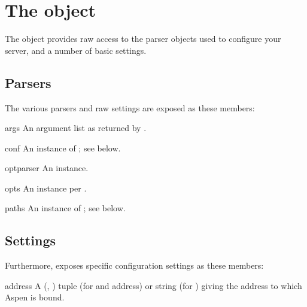 \section{The  object}
\label{api-configuration}

The  object provides raw access to the parser objects
used to configure your server, and a number of basic settings.

\subsection{Parsers}

The various parsers and raw settings are exposed as these members:

\begin{memberdesc}[list]{args}
An argument list as returned by .
\end{memberdesc}

\begin{memberdesc}[ConfFile]{conf}
An instance of ; see below.
\end{memberdesc}

\begin{memberdesc}[OptionParser]{optparser}
An  instance.
\end{memberdesc}

\begin{memberdesc}[Values]{opts}
An  instance per .
\end{memberdesc}

\begin{memberdesc}[Paths]{paths}
An instance of ; see below.
\end{memberdesc}


\subsection{Settings}

Furthermore,  exposes specific configuration settings
as these members:

\begin{memberdesc}[]{address}
A (, ) tuple (for  and 
address) or string (for ) giving the address to which Aspen is
bound.
\end{memberdesc}

